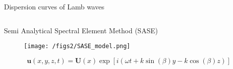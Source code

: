 \documentclass[10pt,aspectratio=169,dvipsnames]{beamer} %
\newcommand{\matr}[1]{\mathbf{#1}} %
\newcommand{\vect}[1]{\mathbf{#1}} %
\begin{document}
\begin{frame}{Dispersion curves of Lamb waves}
	\begin{columns}[T]
	\end{columns}
\end{frame}
\begin{frame}{Semi Analytical Spectral Element Method (SASE)}
	\begin{figure}
		\texttt{[image: /figs2/SASE\_model.png]}
	\end{figure}
	\begin{equation*}
		\vect{u}(x,y,z,t) = \matr{U}(x) \exp \left[ i (\omega t + k \sin (\beta) y - k \cos (\beta) z)\right]
	\end{equation*}
\end{frame}
\end{document}
